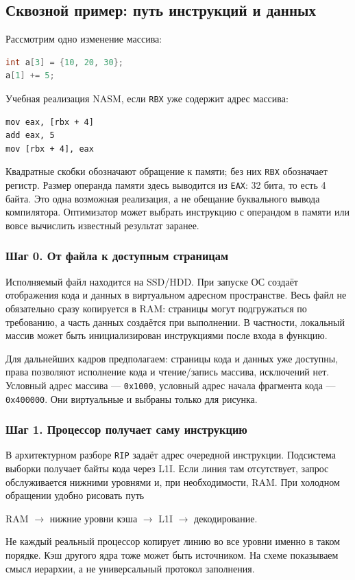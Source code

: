\subsection{Сквозной пример: путь инструкций и данных}
\label{lecture04-trace}
Рассмотрим одно изменение массива:
\begin{lstlisting}[language=C,basicstyle=\ttfamily\small]
int a[3] = {10, 20, 30};
a[1] += 5;
\end{lstlisting}
Учебная реализация NASM, если \texttt{RBX} уже содержит адрес массива:
\begin{lstlisting}[basicstyle=\ttfamily\small]
mov eax, [rbx + 4]
add eax, 5
mov [rbx + 4], eax
\end{lstlisting}
Квадратные скобки обозначают обращение к памяти; без них \texttt{RBX}
обозначает регистр. Размер операнда памяти здесь выводится из \texttt{EAX}:
32 бита, то есть 4 байта. Это одна возможная реализация, а не обещание
буквального вывода компилятора. Оптимизатор может выбрать инструкцию
с операндом в памяти или вовсе вычислить известный результат заранее.

\subsubsection*{Шаг 0. От файла к доступным страницам}
Исполняемый файл находится на SSD/HDD. При запуске ОС создаёт отображения
кода и данных в виртуальном адресном пространстве. Весь файл не обязательно
сразу копируется в RAM: страницы могут подгружаться по требованию, а часть
данных создаётся при выполнении. В частности, локальный массив может быть
инициализирован инструкциями после входа в функцию.

Для дальнейших кадров предполагаем: страницы кода и данных уже доступны,
права позволяют исполнение кода и чтение/запись массива, исключений нет.
Условный адрес массива --- \texttt{0x1000}, условный адрес начала фрагмента
кода --- \texttt{0x400000}. Они виртуальные и выбраны только для рисунка.

\subsubsection*{Шаг 1. Процессор получает саму инструкцию}
В архитектурном разборе \texttt{RIP} задаёт адрес очередной инструкции.
Подсистема выборки получает байты кода через L1I. Если линия там отсутствует,
запрос обслуживается нижними уровнями и, при необходимости, RAM.
При холодном обращении удобно рисовать путь
\begin{center}
RAM $\longrightarrow$ нижние уровни кэша $\longrightarrow$ L1I
$\longrightarrow$ декодирование.
\end{center}
Не каждый реальный процессор копирует линию во все уровни именно в таком
порядке. Кэш другого ядра тоже может быть источником. На схеме показываем
смысл иерархии, а не универсальный протокол заполнения.

